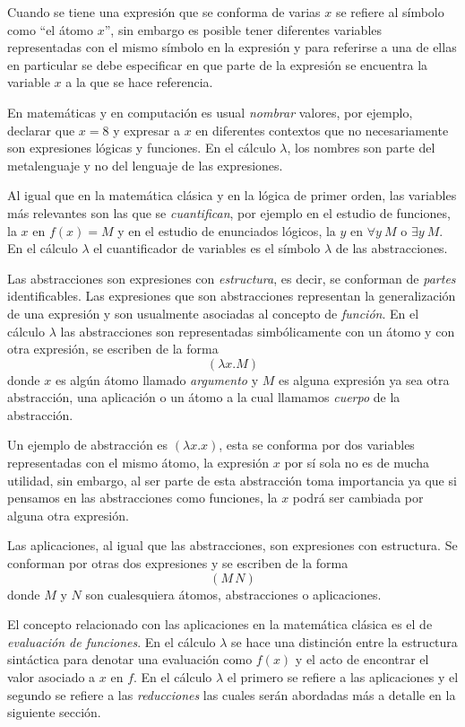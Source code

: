 Cuando se tiene una expresión que se conforma de varias \( x \) se refiere al símbolo como ``el átomo \( x \)'', sin embargo es posible tener diferentes variables representadas con el mismo símbolo en la expresión y para referirse a una de ellas en particular se debe especificar en que parte de la expresión se encuentra la variable \( x \) a la que se hace referencia.

En matemáticas y en computación es usual \emph{nombrar} valores, por ejemplo, declarar que \( x = 8 \) y expresar a \( x \) en diferentes contextos que no necesariamente son expresiones lógicas y funciones. En el cálculo \( λ \), los nombres son parte del metalenguaje y no del lenguaje de las expresiones.

Al igual que en la matemática clásica y en la lógica de primer orden, las variables más relevantes son las que se \emph{cuantifican}, por ejemplo en el estudio de funciones, la \( x \) en \( f(x) = M \) y en el estudio de enunciados lógicos, la \( y \) en \( \forall y\ M \) o \( \exists y\ M \). En el cálculo \( λ \) el cuantificador de variables es el símbolo \( λ \) de las abstracciones.

Las abstracciones son expresiones con \emph{estructura}, es decir, se conforman de \emph{partes} identificables. Las expresiones que son abstracciones representan la generalización de una expresión y son usualmente asociadas al concepto de \emph{función}. En el cálculo \( λ \) las abstracciones son representadas simbólicamente con un átomo y con otra expresión, se escriben de la forma \[ (λx.M) \] donde \( x \) es algún átomo llamado \emph{argumento} y \( M \) es alguna expresión ya sea otra abstracción, una aplicación o un átomo a la cual llamamos \emph{cuerpo} de la abstracción.

Un ejemplo de abstracción es \( (λx.x) \), esta se conforma por dos variables representadas con el mismo átomo, la expresión \( x \) por sí sola no es de mucha utilidad, sin embargo, al ser parte de esta abstracción toma importancia ya que si pensamos en las abstracciones como funciones, la \( x \) podrá ser cambiada por alguna otra expresión.

Las aplicaciones, al igual que las abstracciones, son expresiones con estructura. Se conforman por otras dos expresiones y se escriben de la forma \[ (M\, N) \] donde \( M \) y \( N \) son cualesquiera átomos, abstracciones o aplicaciones.

El concepto relacionado con las aplicaciones en la matemática clásica es el de \emph{evaluación de funciones}. En el cálculo \( λ \) se hace una distinción entre la estructura sintáctica para denotar una evaluación como \( f(x) \) y el acto de encontrar el valor asociado a \( x \) en \( f \). En el cálculo \( λ \) el primero se refiere a las aplicaciones y el segundo se refiere a las \emph{reducciones} las cuales serán abordadas más a detalle en la siguiente sección.

